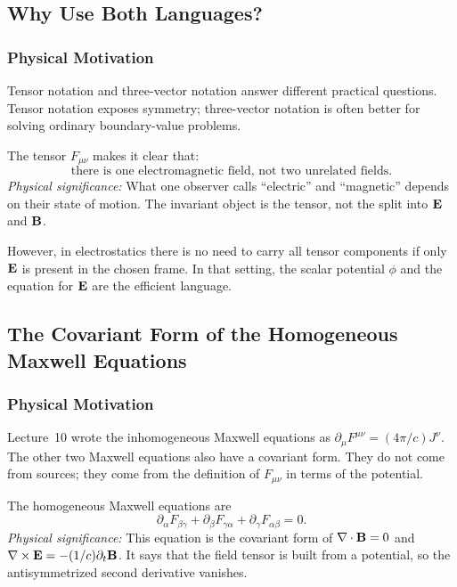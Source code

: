 \subsection{Why Use Both Languages?}\label{subsec:lec11-which-language}

\subsubsection*{Physical Motivation}
Tensor notation and three-vector notation answer different practical questions.
Tensor notation exposes symmetry; three-vector notation is often better for solving
ordinary boundary-value problems.

The tensor $F_{\mu\nu}$ makes it clear that:
\begin{equation}\label{eq:lec11-one-field}
  \boxed{
  \text{there is one electromagnetic field, not two unrelated fields.}
  }
\end{equation}
\textit{Physical significance:} What one observer calls ``electric'' and ``magnetic''
depends on their state of motion.  The invariant object is the tensor, not the split
into $\mathbf{E}$ and $\mathbf{B}$.

However, in electrostatics there is no need to carry all tensor components if only
$\mathbf{E}$ is present in the chosen frame.  In that setting, the scalar potential $\phi$
and the equation for $\mathbf{E}$ are the efficient language.

\subsection{The Covariant Form of the Homogeneous Maxwell Equations}\label{subsec:lec11-homogeneous}

\subsubsection*{Physical Motivation}
Lecture~10 wrote the inhomogeneous Maxwell equations as
$\partial_\mu F^{\mu\nu}=(4\pi/c)J^\nu$.  The other two Maxwell equations also have
a covariant form.  They do not come from sources; they come from the definition of
$F_{\mu\nu}$ in terms of the potential.

The homogeneous Maxwell equations are
\begin{equation}\label{eq:lec11-homogeneous-covariant}
  \boxed{
  \partial_\alpha F_{\beta\gamma}
  +
  \partial_\beta F_{\gamma\alpha}
  +
  \partial_\gamma F_{\alpha\beta}
  =
  0 .
  }
\end{equation}
\textit{Physical significance:} This equation is the covariant form of
$\nabla\cdot\mathbf{B}=0$ and $\nabla\times\mathbf{E}=-(1/c)\partial_t\mathbf{B}$.  It says that the
field tensor is built from a potential, so the antisymmetrized second derivative
vanishes.


